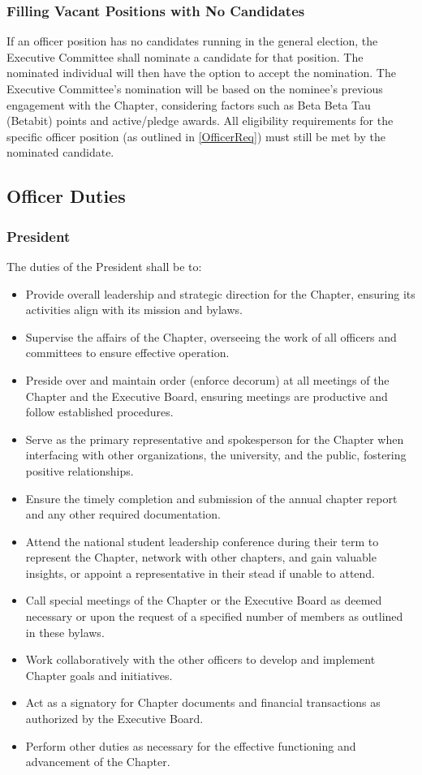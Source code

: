 \documentclass[10pt, oneside]{article}
\begin{document}
\subsubsection{Filling Vacant Positions with No Candidates}
If an officer position has no candidates running in the general election, the Executive Committee shall nominate a candidate for that position. The nominated individual will then have the option to accept the nomination. The Executive Committee's nomination will be based on the nominee's previous engagement with the Chapter, considering factors such as Beta Beta Tau (Betabit) points and active/pledge awards. All eligibility requirements for the specific officer position (as outlined in \ref{OfficerReq}) must still be met by the nominated candidate.


\subsection{Officer Duties}

\subsubsection{President}
The duties of the President shall be to:
\begin{itemize}
    \item Provide overall leadership and strategic direction for the Chapter, ensuring its activities align with its mission and bylaws.
    \item Supervise the affairs of the Chapter, overseeing the work of all officers and committees to ensure effective operation.
    \item Preside over and maintain order (enforce decorum) at all meetings of the Chapter and the Executive Board, ensuring meetings are productive and follow established procedures.
    \item Serve as the primary representative and spokesperson for the Chapter when interfacing with other organizations, the university, and the public, fostering positive relationships.
    \item Ensure the timely completion and submission of the annual chapter report and any other required documentation.
    \item Attend the national student leadership conference during their term to represent the Chapter, network with other chapters, and gain valuable insights, or appoint a representative in their stead if unable to attend.
    \item Call special meetings of the Chapter or the Executive Board as deemed necessary or upon the request of a specified number of members as outlined in these bylaws.
    \item Work collaboratively with the other officers to develop and implement Chapter goals and initiatives.
    \item Act as a signatory for Chapter documents and financial transactions as authorized by the Executive Board.
    \item Perform other duties as necessary for the effective functioning and advancement of the Chapter.
\end{itemize}
\end{document}
